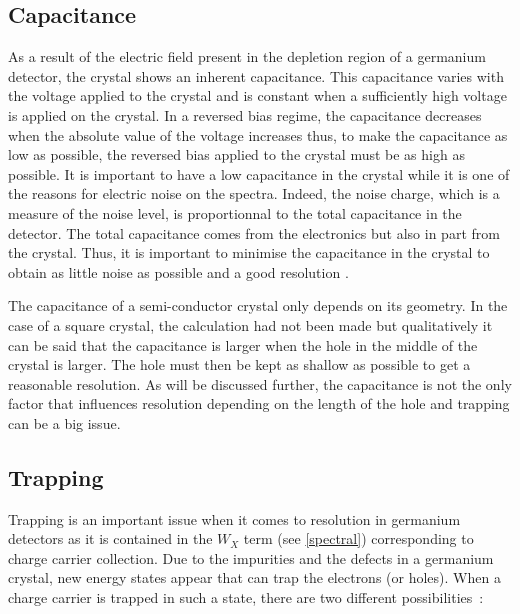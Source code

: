 \documentclass[11pt,a4paper]{article}
\begin{document}
\subsection{Capacitance}

As a result of the electric field present in the depletion region of a germanium detector, the crystal shows an inherent capacitance. This capacitance varies with the voltage applied to the crystal and is constant when a sufficiently high voltage is applied on the crystal. In a reversed bias regime, the capacitance decreases when the absolute value of the voltage increases thus, to make the capacitance as low as possible, the reversed bias applied to the crystal must be as high as possible. It is important to have a low capacitance in the crystal while it is one of the reasons for electric noise on the spectra. Indeed, the noise charge, which is a measure of the noise level, is proportionnal to the total capacitance in the detector. The total capacitance comes from the electronics but also in part from the crystal. Thus, it is important to minimise the capacitance in the crystal to obtain as little noise as possible and a good resolution \cite{Kephart}.

The capacitance of a semi-conductor crystal only depends on its geometry. In the case of a square crystal, the calculation had not been made but qualitatively it can be said that the capacitance is larger when the hole in the middle of the crystal is larger. The hole must then be kept as shallow as possible to get a reasonable resolution. As will be discussed further, the capacitance is not the only factor that influences resolution depending on the length of the hole and trapping can be a big issue.

\subsection{Trapping}

Trapping is an important issue when it comes to resolution in germanium detectors as it is contained in the $W_X$ term (see \ref{spectral}) corresponding to charge carrier collection. Due to the impurities and the defects in a germanium crystal, new energy states appear that can trap the electrons (or holes). When a charge carrier is trapped in such a state, there are two different possibilities~:
\end{document}
